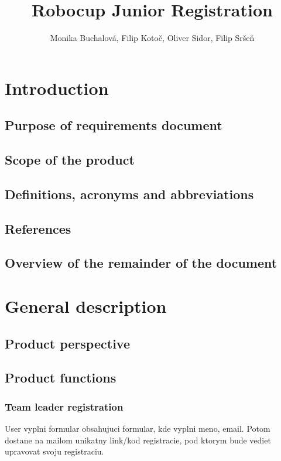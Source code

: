 \documentclass[a4paper]{article}
\title{Robocup Junior Registration}
\author{Monika Buchalová, Filip Kotoč, Oliver Sidor, Filip Sršeň}
\begin{document}
	\maketitle
	
	\tableofcontents
	\newpage
	\section{Introduction}
	\label{sec:Intro}
	\subsection{Purpose of requirements document}
	\label{sub:purpose}
	\subsection{Scope of the product}
	\label{sub:scope}
	\subsection{Definitions, acronyms and abbreviations}
	\label{sub:definitios}
	\subsection{References}
	\label{sub:references}
	\subsection{Overview of the remainder of the document}
	\label{sub:overview}
	
	\newpage
	
	\section{General description}
	\label{sec:general-desc}
	\subsection{Product perspective}
	\label{sub:perspective}
	\subsection{Product functions}
	\label{sub:functions}
	\subsubsection{Team leader registration}
	User vyplni formular obsahujuci formular, kde vyplni meno, email. Potom dostane na mailom unikatny link/kod registracie, pod ktorym bude vediet upravovat svoju registraciu.
\end{document}
